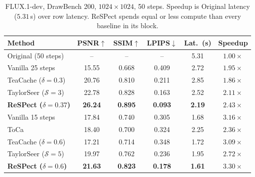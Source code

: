 \documentclass{article} %
\begin{document}

\begin{table}[t]
  \centering
  \caption{FLUX.1-dev, DrawBench 200, $1024{\times}1024$, 50 steps. Speedup is Original latency ($5.31$\,s) over row latency.
  ReSPect spends equal or less compute than every baseline in its block.}
  \label{tab:flux}
  \vspace{0.1cm}
  {\small\setlength{\tabcolsep}{4pt}
  \begin{tabular}{lccccc}
    \toprule
    Method & PSNR$\uparrow$ & SSIM$\uparrow$ & LPIPS$\downarrow$ & Lat.\ (s) & Speedup \\
    \midrule
    Original (50 steps) & -- & -- & -- & 5.31 & $1.00\times$ \\
    \midrule
    Vanilla 25 steps & 15.55 & 0.668 & 0.409 & 2.72 & $1.95\times$ \\
    TeaCache ($\delta{=}0.3$) & 20.76 & 0.810 & 0.211 & 2.85 & $1.86\times$ \\
    TaylorSeer ($\mathcal{S}{=}3$) & 22.78 & 0.828 & 0.163 & 2.52 & $2.11\times$ \\
    \textbf{ReSPect ($\delta{=}0.37$)} & \textbf{26.24} & \textbf{0.895} & \textbf{0.093} & \textbf{2.19} & {$2.43\times$} \\
    \midrule
    Vanilla 15 steps & 17.84 & 0.740 & 0.305 & 1.68 & $3.16\times$ \\
    ToCa & 18.40 & 0.700 & 0.324 & 2.25 & $2.36\times$ \\
    TeaCache ($\delta{=}0.6$) & 17.21 & 0.714 & 0.348 & 1.72 & $3.09\times$ \\
    TaylorSeer ($\mathcal{S}{=}5$) & 19.97 & 0.762 & 0.236 & 1.95 & $2.72\times$ \\
    \textbf{ReSPect ($\delta{=}0.6$)} & \textbf{21.63} & \textbf{0.823} & \textbf{0.178} & \textbf{1.61} & \textbf{$3.30\times$} \\
    \bottomrule
  \end{tabular}}
\end{table}
\end{document}
